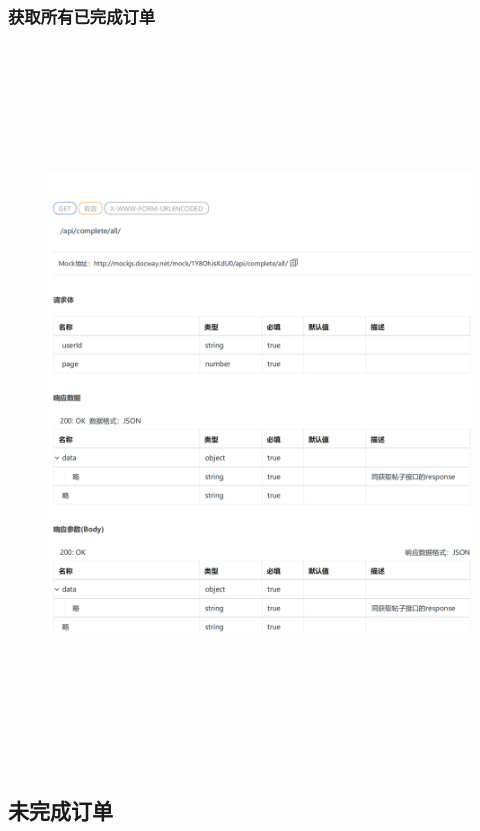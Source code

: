         \subsubsection{获取所有已完成订单}
        \begin{figure}[h]
            \centering
            \includegraphics[height=19.0cm,width=14.0cm]{design/image/api31.png} 
            \end{figure}  
            \newpage
        \subsection{未完成订单}        
